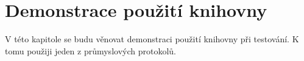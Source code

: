 \chapter{Demonstrace použití knihovny}

V této kapitole se budu věnovat demonstraci použití knihovny při testování. K tomu použiji jeden z průmyslových protokolů.


